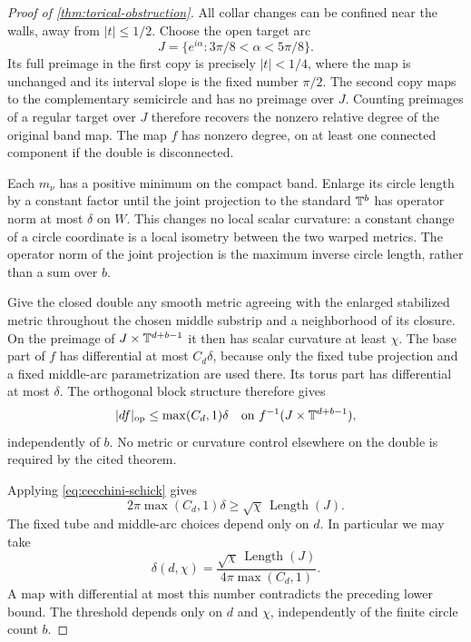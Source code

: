 \begin{proof}[Proof of \cref{thm:torical-obstruction}]
All collar changes can be confined near the walls, away from $|t|\le1/2$.
Choose the open target arc
\[
 J=\{e^{i\alpha}:3\pi/8<\alpha<5\pi/8\}.
\]
Its full preimage in the first copy is precisely $|t|<1/4$, where the
map is unchanged and its interval slope is the fixed number $\pi/2$.
The second copy maps to the complementary semicircle and has no preimage
over $J$. Counting preimages of a regular target over $J$ therefore
recovers the nonzero relative degree of the original band map. The map
$f$ has nonzero degree, on at least one connected component if the
double is disconnected.

Each $m_\nu$ has a positive minimum on the compact band. Enlarge its circle
length by a constant factor until the joint projection to the standard
$\mathbb T^b$ has operator norm at most $\delta$ on $W$. This changes no local
scalar curvature: a constant change of a circle coordinate is a local
isometry between the two warped metrics. The operator norm of the joint
projection is the maximum inverse circle length, rather than a sum over
$b$.

Give the closed double any smooth metric agreeing with the enlarged
stabilized metric throughout the chosen middle substrip and a neighborhood
of its closure. On the preimage of $J\times\mathbb T^{d+b-1}$ it then has scalar
curvature at least $\chi$. The base part of $f$ has differential at most
$C_d\delta$, because only the fixed tube projection and a fixed middle-arc
parametrization are used there. Its torus part has differential at most
$\delta$. The orthogonal block structure therefore gives
\[
 |df|_{\mathrm{op}}\le\max(C_d,1)\delta
 \quad\text{on }f^{-1}(J\times\mathbb T^{d+b-1}),
\]
independently of $b$. No metric or curvature control elsewhere on the
double is required by the cited theorem.

Applying \eqref{eq:cecchini-schick} gives
\[
 2\pi\max(C_d,1)\delta
 \ge\sqrt\chi\,\operatorname{Length}(J).
\]
The fixed tube and middle-arc choices depend only on $d$. In particular
we may take
\[
 \delta(d,\chi)=
 \frac{\sqrt\chi\,\operatorname{Length}(J)}
      {4\pi\max(C_d,1)}.
\]
A map with differential at most this number contradicts the preceding
lower bound. The threshold depends only on $d$ and $\chi$, independently
of the finite circle count $b$.
\end{proof}
